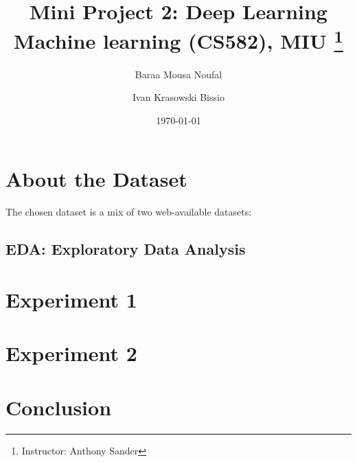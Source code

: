 \documentclass[titlepage, 11pt]{article}
\title{
	\textbf{Mini Project 2: Deep Learning} \\
	Machine learning (CS582), MIU \thanks{Instructor: Anthony Sander}
}
\author{
    Baraa Mousa Noufal \and Ivan Krasowski Bissio
}
\date{\today}
\begin{document}
\maketitle
\tableofcontents

\begin{abstract}
	
\end{abstract}

\section{About the Dataset}
The chosen dataset is a mix of two web-available datasets:

\subsection{EDA: Exploratory Data Analysis}


\section{Experiment 1}


\section{Experiment 2}


\clearpage
\section{Conclusion}

\end{document}
